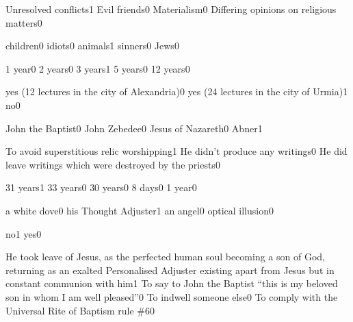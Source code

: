 {Unresolved conflicts}{1}
{Evil friends}{0}
{Materialism}{0}
{Differing opinions on religious matters}{0}
\qstop

{children}{0}
{idiots}{0}
{animals}{1}
{sinners}{0}
{Jews}{0}
\qstop


{1 year}{0}
{2 years}{0}
{3 years}{1}
{5 years}{0}
{12 years}{0}
\qstop

{yes (12 lectures in the city of Alexandria)}{0}
{yes (24 lectures in the city of Urmia)}{1}
{no}{0}
\qstop


{John the Baptist}{0}
{John Zebedee}{0}
{Jesus of Nazareth}{0}
{Abner}{1}
\qstop


{To avoid superstitious relic worshipping}{1}
{He didn't produce any writings}{0}
{He did leave writings which were destroyed by the priests}{0}
\qstop

{31 years}{1}
{33 years}{0}
{30 years}{0}
{8 days}{0}
{1 year}{0}
\qstop

{a white dove}{0}
{his Thought Adjuster}{1}
{an angel}{0}
{optical illusion}{0}
\qstop

{no}{1}
{yes}{0}
\qstop

{He took leave of Jesus, as the perfected human soul becoming a son of God, returning as an exalted Personalised Adjuster existing apart from Jesus but in constant communion with him}{1}
{To say to John the Baptist ``this is my beloved son in whom I am well pleased''}{0}
{To indwell someone else}{0}
{To comply with the Universal Rite of Baptism rule \#6}{0}
\qstop

